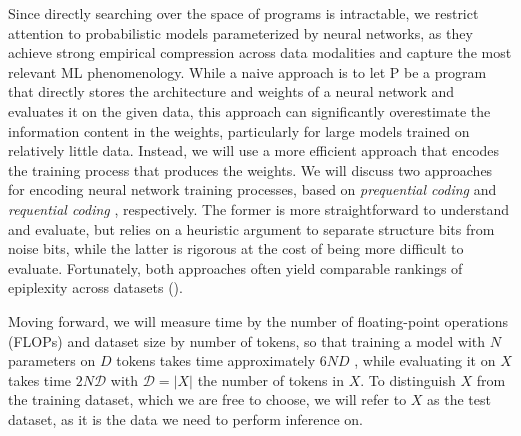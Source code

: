 \documentclass[twoside]{article}
\newcommand{\D}{\mathcal{D}}
\begin{document}
Since directly searching over the space of programs is intractable, we restrict attention to probabilistic models parameterized by neural networks, as they achieve strong empirical compression across data modalities \citep{mackay2003information, goldblum2023no, deletang2023language, balle2018variational} and capture the most relevant ML phenomenology. %
While a naive approach is to let $\mathrm{P}$ be a program that directly stores the architecture and weights of a neural network and evaluates it on the given data, this approach can significantly overestimate the information content in the weights, particularly for large models trained on relatively little data. Instead, we will use a more efficient approach that encodes the training process that produces the weights. We will discuss two approaches for encoding neural network training processes, based on \emph{prequential coding} \citep{dawid1984present} and \emph{requential coding} \citep{finzi2026requential}, respectively. The former is more straightforward to understand and evaluate, but relies on a heuristic argument to separate structure bits from noise bits, while the latter is rigorous at the cost of being more difficult to evaluate. 
%
Fortunately, both approaches often yield comparable rankings of epiplexity across datasets ().
%

Moving forward, we will measure time by the number of floating-point operations (FLOPs) and dataset size by number of tokens, so that training a model with $N$ parameters on $D$ tokens takes time approximately $6ND$ \citep{kaplan2020scaling}, while evaluating it on $X$ takes time $2N\D$ with $\D=|X|$ the number of tokens in $X.$ To distinguish $X$ from the training dataset, which we are free to choose, we will refer to $X$ as the test dataset, as it is the data we need to perform inference on. 
\end{document}
